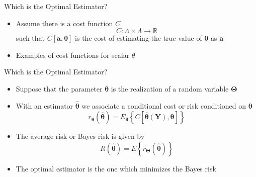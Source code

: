 \documentclass[t]{beamer}
\begin{document}
\begin{frame}{Which is the Optimal Estimator?}
  \footnotesize
  \begin{itemize}
    \item \pause Assume there is a cost function $C$
      \begin{equation*}
        C : \Lambda \times \Lambda \rightarrow \mathbb{R}
      \end{equation*}
      such that $C[\mathbf{a},\boldsymbol{\theta}]$ is the cost of estimating the true value of $\boldsymbol{\theta}$ as $\mathbf{a}$
    \item \pause Examples of cost functions for scalar $\theta$
  \end{itemize}
  \normalsize
\end{frame}

\begin{frame}{Which is the Optimal Estimator?}
  \footnotesize
  \begin{itemize}
    \item Suppose that the parameter $\boldsymbol{\theta}$ is the realization of a random variable $\boldsymbol{\Theta}$
    \item \pause With an estimator $\hat{\boldsymbol{\theta}}$ we associate a conditional cost or risk conditioned on $\boldsymbol{\theta}$
      \begin{equation*}
        r_{\boldsymbol{\theta}}(\hat{\boldsymbol{\theta}}) = E_{\boldsymbol{\theta}} \left\{ C\left[\hat{\boldsymbol{\theta}}(\mathbf{Y}), \boldsymbol{\theta} \right]\right\}
      \end{equation*}
    \item \pause The average risk or Bayes risk is given by
      \begin{equation*}
        R(\hat{\boldsymbol{\theta}}) = E\left\{ r_{\boldsymbol{\Theta}}(\hat{\boldsymbol{\theta}})\right\}
      \end{equation*}
    \item \pause The optimal estimator is the one which minimizes the Bayes risk
  \end{itemize}
  \normalsize
\end{frame}
\end{document}
